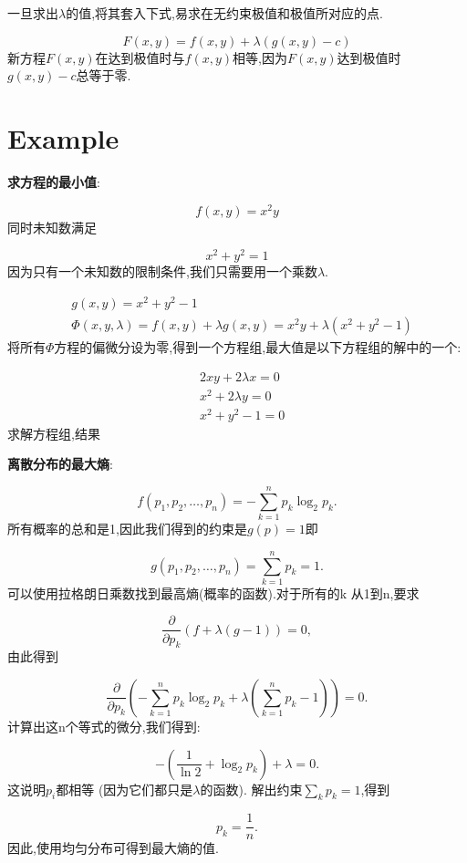 一旦求出$\lambda$的值,将其套入下式,易求在无约束极值和极值所对应的点.

$$ F \left( x , y \right)  =  f \left( x , y \right) + \lambda \left( g \left( x , y \right) - c \right) $$
新方程$F(x,y)$在达到极值时与$f(x,y)$相等,因为$F(x,y)$达到极值时$g(x,y)-c$总等于零.

\section{Example}
\begin{example}
\textbf{求方程的最小值}:

$$ f(x, y) = x^2 y $$
同时未知数满足

$$ x^2 + y^2 = 1 $$
因为只有一个未知数的限制条件,我们只需要用一个乘数$\lambda$.

$$
\begin{aligned}
		& g (x, y) = x^2 +y^2 -1 \\
		& \Phi (x, y, \lambda) = f(x,y) + \lambda g(x, y) = x^2 y + \lambda (x^2 + y^2 - 1)
\end{aligned}
$$
将所有$\Phi$方程的偏微分设为零,得到一个方程组,最大值是以下方程组的解中的一个:

$$
\begin{aligned}
		& 2 x y + 2 \lambda x = 0 \\
		& x^2 + 2 \lambda y = 0 \\
		& x^2 + y^2 -1 = 0
\end{aligned}
$$
求解方程组,结果
\end{example}

\begin{example}
\textbf{离散分布的最大熵}:

$$ f(p_1,p_2,\ldots,p_n) = -\sum_{k=1}^n p_k\log_2 p_k.  $$
所有概率的总和是1,因此我们得到的约束是$g(p)= 1$即

$$ g(p_1,p_2,\ldots,p_n)=\sum_{k=1}^n p_k=1.  $$
可以使用拉格朗日乘数找到最高熵(概率的函数).对于所有的k 从1到n,要求

$$ \frac{\partial}{\partial p_k}(f+\lambda (g-1))=0, $$
由此得到

$$ \frac{\partial}{\partial p_k}\left(-\sum_{k=1}^n p_k \log_2 p_k + \lambda (\sum_{k=1}^n p_k - 1) \right) = 0.  $$
计算出这n个等式的微分,我们得到:

$$ -\left(\frac{1}{\ln 2}+\log_2 p_k \right) + \lambda = 0.  $$
这说明$p_i$都相等 (因为它们都只是$\lambda$的函数). 解出约束$\sum_k p_k = 1$,得到

$$ p_k = \frac{1}{n}.$$
因此,使用均匀分布可得到最大熵的值.
\end{example}

